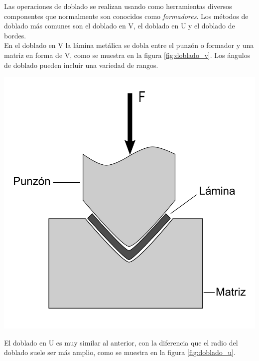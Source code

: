 Las operaciones de doblado se realizan usando como herramientas diversos componentes 
que normalmente son conocidos como \textit{formadores}. Los métodos de doblado más 
comunes son el doblado en V, el doblado en U y el doblado de bordes.\\

En el doblado en V la lámina metálica se dobla entre el punzón o formador y una matriz 
en forma de V, como se muestra en la figura \ref{fig:doblado_v}. Los ángulos de doblado 
pueden incluir una variedad de rangos.

\begin{center}
\includegraphics[scale=0.4]{src/ch2/doblado_v}
\label{fig:doblado_v}
\end{center}

El doblado en U es muy similar al anterior, con la diferencia que el radio del doblado 
suele ser más amplio, como se muestra en la figura \ref{fig:doblado_u}.

